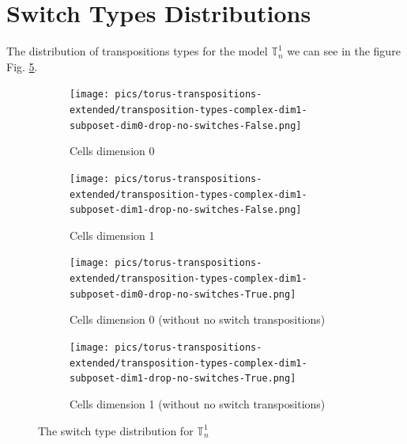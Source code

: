 \documentclass{article}
\begin{document}
\section{Switch Types Distributions}

\par The distribution of transpositions types for the model $\mathbb{T}^{1}_n$ we can see in the figure Fig. \ref{fig:typesdistribution1}.
\begin{figure}[htbp]
\centering
\begin{subfigure}[b]{0.45\textwidth}
    \texttt{[image: pics/torus-transpositions-extended/transposition-types-complex-dim1-subposet-dim0-drop-no-switches-False.png]}
    \caption{Cells dimension 0}
    \label{fig:complex1cells0}
\end{subfigure}
\hfill
\begin{subfigure}[b]{0.45\textwidth}
    \texttt{[image: pics/torus-transpositions-extended/transposition-types-complex-dim1-subposet-dim1-drop-no-switches-False.png]}
    \caption{Cells dimension 1}
    \label{fig:complex1cells1}
\end{subfigure}
\vspace{0.5cm}
\begin{subfigure}[b]{0.45\textwidth}
    \texttt{[image: pics/torus-transpositions-extended/transposition-types-complex-dim1-subposet-dim0-drop-no-switches-True.png]}
    \caption{Cells dimension 0 (without no switch transpositions)}
    \label{fig:complex1cells0onlyswitch}
\end{subfigure}
\hfill
\begin{subfigure}[b]{0.45\textwidth}
    \texttt{[image: pics/torus-transpositions-extended/transposition-types-complex-dim1-subposet-dim1-drop-no-switches-True.png]}
    \caption{Cells dimension 1 (without no switch transpositions)}
    \label{fig:complex1cells1onlyswitch}
\end{subfigure}
\caption{The switch type distribution for $\mathbb{T}_n^{1}$}
\label{fig:typesdistribution1}
\end{figure}
\end{document}
